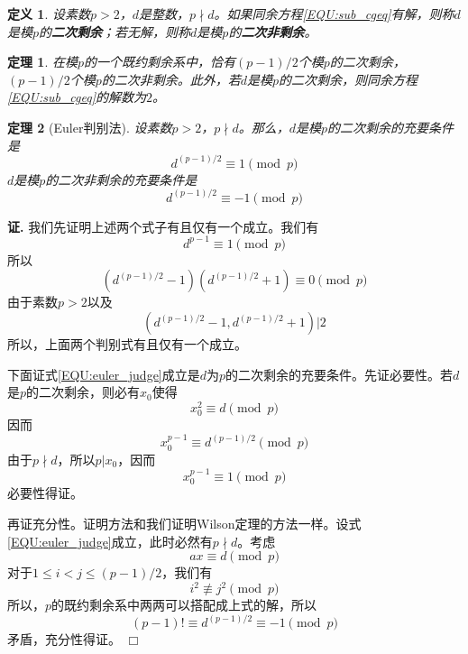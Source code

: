 \documentclass{ctexrep}
\newcommand{\bbold}[1]{\textbf{#1}}
\newtheorem{thrm}{定理}[section]
\newtheorem{defn}{定义}[section]
\renewenvironment{proof}[1][证]{\noindent \textbf{#1.} }{\hfill$\Box$}
\begin{document}
\begin{defn}
设素数$p>2$，$d$是整数，$p\nmid d$。如果同余方程\ref{EQU:sub_cgeq}有解，则称$d$是模$p$的\bbold{二次剩余}；若无解，则称$d$是模$p$的\bbold{二次非剩余}。
\end{defn}

\begin{thrm}
在模$p$的一个既约剩余系中，恰有$(p-1)/2$个模$p$的二次剩余，$(p-1)/2$个模$p$的二次非剩余。此外，若$d$是模$p$的二次剩余，则同余方程\ref{EQU:sub_cgeq}的解数为$2$。
\end{thrm}

\begin{thrm}[Euler判别法]
设素数$p>2$，$p\nmid d$。那么，$d$是模$p$的二次剩余的充要条件是
\begin{equation}\label{EQU:euler_judge}
d^{(p-1)/2}\equiv 1\pmod{p}
\end{equation}
$d$是模$p$的二次非剩余的充要条件是
\begin{equation}
d^{(p-1)/2}\equiv -1\pmod{p}
\end{equation}
\end{thrm}
\begin{proof}
我们先证明上述两个式子有且仅有一个成立。我们有
\begin{displaymath}
d^{p-1}\equiv 1\pmod{p}
\end{displaymath}
所以
\begin{displaymath}
(d^{(p-1)/2}-1)(d^{(p-1)/2}+1)\equiv 0\pmod{p}
\end{displaymath}
由于素数$p>2$以及
\begin{displaymath}
(d^{(p-1)/2}-1,d^{(p-1)/2}+1)|2
\end{displaymath}
所以，上面两个判别式有且仅有一个成立。

下面证式\ref{EQU:euler_judge}成立是$d$为$p$的二次剩余的充要条件。先证必要性。若$d$是$p$的二次剩余，则必有$x_0$使得
\begin{displaymath}
x_0^2\equiv d\pmod{p}
\end{displaymath}
因而
\begin{displaymath}
x_0^{p-1}\equiv d^{(p-1)/2}\pmod{p}
\end{displaymath}
由于$p\nmid d$，所以$p|x_0$，因而
\begin{displaymath}
x_0^{p-1}\equiv 1\pmod{p}
\end{displaymath}
必要性得证。

再证充分性。证明方法和我们证明Wilson定理的方法一样。设式\ref{EQU:euler_judge}成立，此时必然有$p\nmid d$。考虑
\begin{displaymath}
ax\equiv d\pmod{p}
\end{displaymath}
对于$1\leq i<j\leq (p-1)/2$，我们有
\begin{displaymath}
i^2\not\equiv j^2\pmod{p}
\end{displaymath}
所以，$p$的既约剩余系中两两可以搭配成上式的解，所以
\begin{displaymath}
(p-1)!\equiv d^{(p-1)/2}\equiv -1\pmod{p}
\end{displaymath}
矛盾，充分性得证。
\end{proof}
\end{document}
